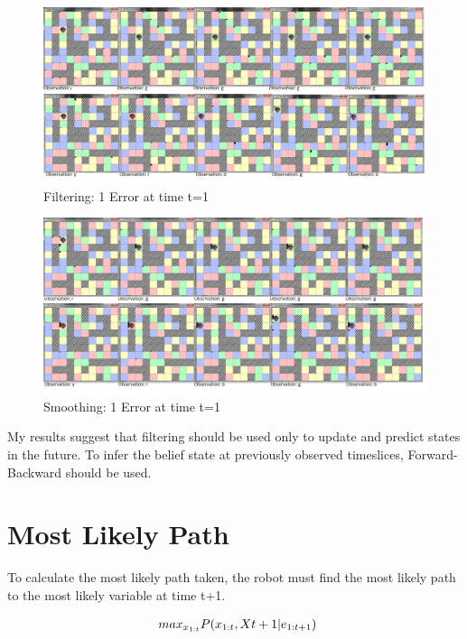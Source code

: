 \documentclass[a4paper]{article}
\begin{document}
\begin{figure}[H]
\centering
\includegraphics[width=1.2\textwidth]{4x4WallMazeFiltering_mistake_at1.png}
\caption{\label{fig:2x2 maze}Filtering: 1 Error at time t=1}
\end{figure}

\begin{figure}[H]
\centering
\includegraphics[width=1.2\textwidth]{4x4WallMazeSmoothing_mistake_at1.png}
\caption{\label{fig:2x2 maze}Smoothing: 1 Error at time t=1}
\end{figure}

My results suggest that filtering should be used only to update and predict states in the future. To infer the belief state at previously observed timeslices, Forward-Backward should be used.

\section{Most Likely Path}

To calculate the most likely path taken, the robot must find the most likely path to the most likely variable at time t+1.

\begin{equation}
\begin{array}{l@{}l}
max_{x_{1:t}} P(x_{1:t},X{t+1}|e_{1:t+1})
\end{array}
\end{equation}
\end{document}
